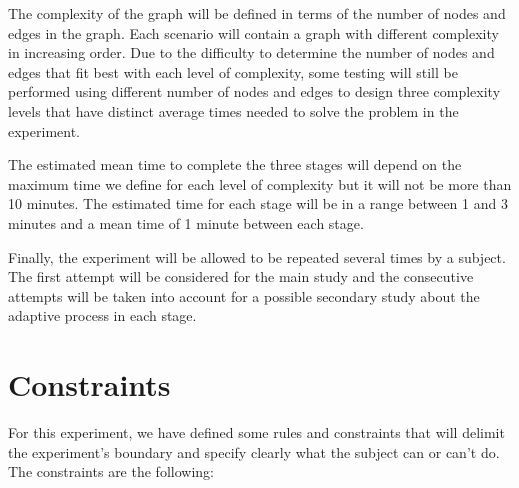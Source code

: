 The complexity of the graph will be defined in terms of the number of
nodes and edges in the graph. Each scenario will contain a graph with
different complexity in increasing order. Due to the difficulty to
determine the number of nodes and edges that fit best with each level of
complexity, some testing will still be performed using different number
of nodes and edges to design three complexity levels that have distinct
average times needed to solve the problem in the experiment.

The estimated mean time to complete the three stages will depend on the
maximum time we define for each level of complexity but it will not be
more than 10 minutes. The estimated time for each stage will be in a
range between 1 and 3 minutes and a mean time of 1 minute between each
stage.

Finally, the experiment will be allowed to be repeated several times by
a subject. The first attempt will be considered for the main study and
the consecutive attempts will be taken into account for a possible
secondary study about the adaptive process in each stage.

\section{Constraints}\label{constraints}

For this experiment, we have defined some rules and constraints that
will delimit the experiment's boundary and specify clearly what the
subject can or can't do. The constraints are the following:

